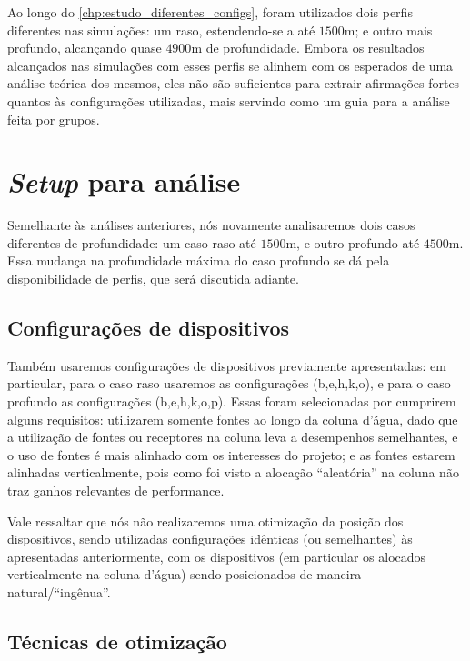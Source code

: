 Ao longo do \cref{chp:estudo_diferentes_configs}, foram utilizados dois perfis diferentes nas simulações: um raso, estendendo-se a até $1500\si{\meter}$; e outro mais profundo, alcançando quase $4900\si{\meter}$ de profundidade. Embora os resultados alcançados nas simulações com esses perfis se alinhem com os esperados de uma análise teórica dos mesmos, eles não são suficientes para extrair afirmações fortes quantos às configurações utilizadas, mais servindo como um guia para a análise feita por grupos.

\section{\textsl{Setup} para análise}

Semelhante às análises anteriores, nós novamente analisaremos dois casos diferentes de profundidade: um caso raso até $1500\si{\meter}$, e outro profundo até $4500\si{\meter}$. Essa mudança na profundidade máxima do caso profundo se dá pela disponibilidade de perfis, que será discutida adiante.

\subsection{Configurações de dispositivos}

Também usaremos configurações de dispositivos previamente apresentadas: em particular, para o caso raso usaremos as configurações (b,e,h,k,o), e para o caso profundo as configurações (b,e,h,k,o,p). Essas foram selecionadas por cumprirem alguns requisitos: utilizarem somente fontes ao longo da coluna d'água, dado que a utilização de fontes ou receptores na coluna leva a desempenhos semelhantes, e o uso de fontes é mais alinhado com os interesses do projeto; e as fontes estarem alinhadas verticalmente, pois como foi visto a alocação ``aleatória'' na coluna não traz ganhos relevantes de performance.%

Vale ressaltar que nós não realizaremos uma otimização da posição dos dispositivos, sendo utilizadas configurações idênticas (ou semelhantes) às apresentadas anteriormente, com os dispositivos (em particular os alocados verticalmente na coluna d'água) sendo posicionados de maneira natural/``ingênua''.

\subsection{Técnicas de otimização}

